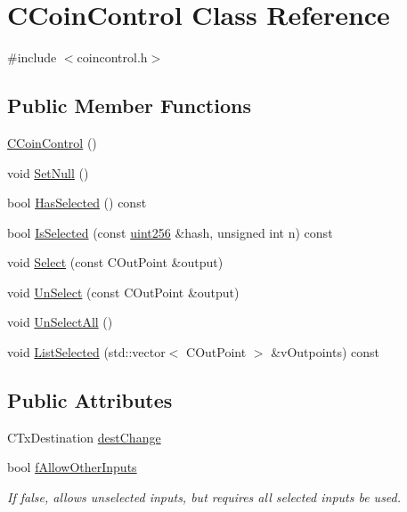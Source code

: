 \hypertarget{class_c_coin_control}{}\section{C\+Coin\+Control Class Reference}
\label{class_c_coin_control}


{\ttfamily \#include $<$coincontrol.\+h$>$}

\subsection*{Public Member Functions}
\begin{DoxyCompactItemize}
\item 
\mbox{\hyperlink{class_c_coin_control_a76b6d0cfff21c4d74a4c4aebfc7f697d}{C\+Coin\+Control}} ()
\item 
void \mbox{\hyperlink{class_c_coin_control_aadca0a9e82e1e6d84dff4649e1d29d31}{Set\+Null}} ()
\item 
bool \mbox{\hyperlink{class_c_coin_control_a20b259681a7c62b2119256a4862091ac}{Has\+Selected}} () const
\item 
bool \mbox{\hyperlink{class_c_coin_control_adcd674d510015f3212e489ab6bd74067}{Is\+Selected}} (const \mbox{\hyperlink{classuint256}{uint256}} \&hash, unsigned int n) const
\item 
void \mbox{\hyperlink{class_c_coin_control_a7903e85623ba9b21583bd4018d17546c}{Select}} (const C\+Out\+Point \&output)
\item 
void \mbox{\hyperlink{class_c_coin_control_a7f9b8135840df5907bc49a4c5cb19ba4}{Un\+Select}} (const C\+Out\+Point \&output)
\item 
void \mbox{\hyperlink{class_c_coin_control_a78bc21b1698e6ae5e6c2fef9758db39c}{Un\+Select\+All}} ()
\item 
void \mbox{\hyperlink{class_c_coin_control_ad2022117a10ff787973af3d7aa62df6f}{List\+Selected}} (std\+::vector$<$ C\+Out\+Point $>$ \&v\+Outpoints) const
\end{DoxyCompactItemize}
\subsection*{Public Attributes}
\begin{DoxyCompactItemize}
\item 
C\+Tx\+Destination \mbox{\hyperlink{class_c_coin_control_aa991ffd830267f6c2103fa7e03213f41}{dest\+Change}}
\item 
bool \mbox{\hyperlink{class_c_coin_control_acd3e8686c8d78535153ed9fd734ef029}{f\+Allow\+Other\+Inputs}}
\begin{DoxyCompactList}\small\item\em If false, allows unselected inputs, but requires all selected inputs be used. \end{DoxyCompactList}\end{DoxyCompactItemize}
